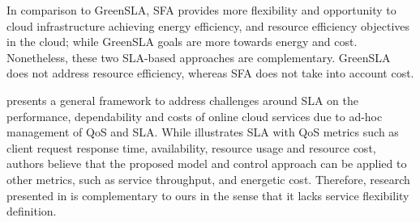 In comparison to GreenSLA, SFA provides more flexibility and opportunity to cloud infrastructure achieving energy efficiency, and resource efficiency objectives in the cloud; while GreenSLA goals are more towards energy and cost. Nonetheless, these two SLA-based approaches are complementary. GreenSLA does not address resource efficiency, whereas SFA does not take into account cost.

\cite{serrano_towards_2013} presents a general framework to address challenges around SLA on the performance, dependability and costs of online cloud services due to ad-hoc management of QoS and SLA. While \cite{serrano_towards_2013} illustrates SLA with QoS metrics such as client request response time, availability, resource usage and resource cost, authors believe that the proposed model and control approach can be applied to other metrics, such as service throughput, and energetic cost. Therefore, research presented in \cite{serrano_towards_2013} is complementary to ours in the sense that it lacks service flexibility definition.




